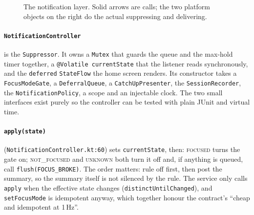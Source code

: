 \documentclass[10pt,a4paper]{article}
\newcommand{\file}[1]{\texttt{\small #1}}          %
\newcommand{\code}[1]{\texttt{#1}}                  %
\newcommand{\state}[1]{\textsc{\small #1}}          %
\begin{document}
\begin{figure}[htbp]
{}
\caption{The notification layer. Solid arrows are calls; the two platform objects on the right do
the actual suppressing and delivering.}\label{fig:notif}
\end{figure}

\paragraph{\code{NotificationController}} is the \code{Suppressor}. It owns a \code{Mutex} that
guards the queue and the max-hold timer together, a \code{@Volatile currentState} that the
listener reads synchronously, and the \code{deferred} \code{StateFlow} the home screen renders.
Its constructor takes a \code{FocusModeGate}, a \code{DeferralQueue}, a \code{CatchUpPresenter},
the \code{SessionRecorder}, the \code{NotificationPolicy}, a scope and an injectable clock. The
two small interfaces exist purely so the controller can be tested with plain JUnit and virtual time.

\paragraph{\code{apply(state)}} (\file{NotificationController.kt:60}) sets \code{currentState},
then: \state{focused} turns the gate on; \state{not\_focused} and \state{unknown} both turn it off
and, if anything is queued, call \code{flush(FOCUS\_BROKE)}. The order matters: rule off first,
then post the summary, so the summary itself is not silenced by the rule. The service only calls
\code{apply} when the effective state changes (\code{distinctUntilChanged}), and
\code{setFocusMode} is idempotent anyway, which together honour the contract's ``cheap and
idempotent at 1\,Hz''.
\end{document}
